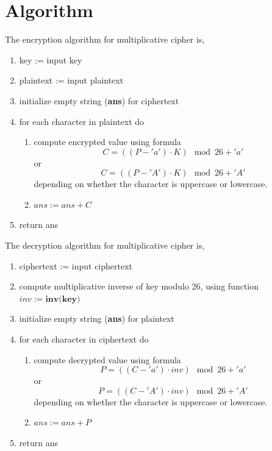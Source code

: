 \section{Algorithm}
The encryption algorithm for multiplicative cipher is,
\begin{enumerate}
  \item key := input key
  \item plaintext := input plaintext
  \item initialize empty string (\textbf{ans}) for ciphertext
  \item for each character in plaintext do
  \begin{enumerate}
    \item compute encrypted value using formula
    $$C = ((P - 'a') \cdot K) \mod 26 + 'a'$$ or
    $$C = ((P - 'A') \cdot K) \mod 26 + 'A'$$ depending on whether the character is uppercase or lowercase.
    \item $ans := ans + C$
  \end{enumerate}
  \item return ans
\end{enumerate}
The decryption algorithm for multiplicative cipher is,
\begin{enumerate}
  \item ciphertext := input ciphertext
  \item compute multiplicative inverse of key modulo 26, using function $inv := \textbf{inv(key)}$
  \item initialize empty string (\textbf{ans}) for plaintext
  \item for each character in ciphertext do
  \begin{enumerate}
    \item compute decrypted value using formula
    $$P = ((C - 'a') \cdot inv) \mod 26 + 'a'$$ or
    $$P = ((C - 'A') \cdot inv) \mod 26 + 'A'$$ depending on whether the character is uppercase or lowercase.
    \item $ans := ans + P$
  \end{enumerate}
  \item return ans
\end{enumerate}


